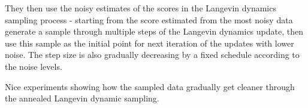 They then use the noisy estimates of the scores in the Langevin dynamics sampling process - starting from the score estimated from the most noisy data generate a sample through multiple steps of the Langevin dynamics update, then use this sample as the initial point for next iteration of the updates with lower noise. The step size is also gradually decreasing by a fixed schedule according to the noise levels.


Nice experiments showing how the sampled data gradually get cleaner through the annealed Langevin dynamic sampling.


